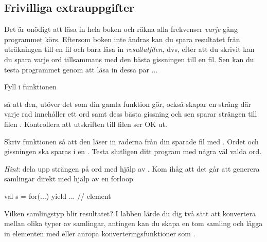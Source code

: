 \subsection{Frivilliga extrauppgifter}
Det är onödigt att läsa in hela boken och räkna alla frekvenser \emph{varje} gång programmet körs. Eftersom boken inte ändras kan du spara resultatet från uträkningen till en fil och bara läsa in \emph{resultatfilen}, dvs, efter att du skrivit  kan du spara varje ord tillsammans med den bästa gissningen till en fil. Sen kan du testa programmet genom att läsa in dessa par ...

\Subtask Fyll i funktionen
\begin{CodeSmall}
def readBook(bookFile: String, saveToFile: String)}
\end{CodeSmall}
så att den, utöver det som din gamla funktion gör, också skapar en sträng där varje rad innehåller ett ord samt dess bästa gissning och sen sparar strängen till filen . Kontrollera att utskriften till filen ser OK ut.

\Subtask Skriv funktionen  så att den läser in raderna från din sparade fil med . Ordet och gissningen ska sparas i en .  Testa slutligen ditt program med några väl valda ord.

\emph{Hint}: dela upp strängen på ord med hjälp av . Kom ihåg att det går att generera samlingar direkt med hjälp av en forloop \begin{CodeSmall}
val s = for(...) yield{
...
// element
}

\end{CodeSmall}
Vilken samlingstyp blir resultatet? I labben lärde du dig två sätt att konvertera mellan olika typer av samlingar, antingen kan du skapa en tom samling  och lägga in elementen med \code{++} eller anropa konverteringsfunktioner som .



